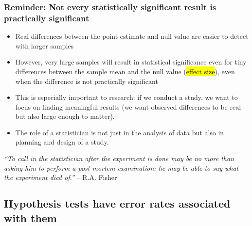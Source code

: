 \documentclass[11pt,containsverbatim,handout,xcolor=xelatex,dvipsnames,table]{beamer}
\begin{document}

\begin{frame}
\frametitle{Reminder: Not every statistically significant result is practically significant}

\begin{itemize}

\item Real differences between the point estimate and null value are easier to detect with larger samples

\item However, very large samples will result in statistical significance even for tiny differences between the 
sample mean and the null value (\hl{effect size}), even when the difference is not practically significant

\item This is especially important to research: if we conduct a study, we want to focus on finding meaningful 
results (we want observed differences to be real but also large enough to matter).

\item The role of a statistician is not just in the analysis of data but also in planning and design of a study.

\end{itemize}

\begin{center}
{\footnotesize \textit{``To call in the statistician after the experiment is done may be no more than asking him 
to perform a post-mortem examination: he may be able to say what the experiment died of.''} -- R.A. Fisher}
\end{center}

\end{frame}


\subsection{Hypothesis tests have error rates associated with them}
\label{mi2}

\end{document}
